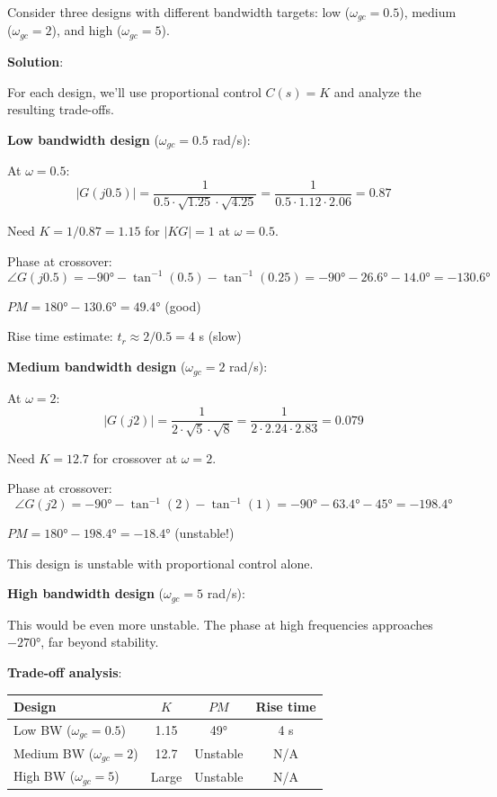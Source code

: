 Consider three designs with different bandwidth targets: low ($\omega_{gc} = 0.5$), medium ($\omega_{gc} = 2$), and high ($\omega_{gc} = 5$).

\textbf{Solution}:

For each design, we'll use proportional control $C(s) = K$ and analyze the resulting trade-offs.

\textbf{Low bandwidth design} ($\omega_{gc} = 0.5$ rad/s):

At $\omega = 0.5$:
\begin{equation}
    |G(j0.5)| = \frac{1}{0.5 \cdot \sqrt{1.25} \cdot \sqrt{4.25}} = \frac{1}{0.5 \cdot 1.12 \cdot 2.06} = 0.87
\end{equation}

Need $K = 1/0.87 = 1.15$ for $|KG| = 1$ at $\omega = 0.5$.

Phase at crossover:
\begin{equation}
    \angle G(j0.5) = -90° - \tan^{-1}(0.5) - \tan^{-1}(0.25) = -90° - 26.6° - 14.0° = -130.6°
\end{equation}

$PM = 180° - 130.6° = 49.4°$ (good)

Rise time estimate: $t_r \approx 2/0.5 = 4$ s (slow)

\textbf{Medium bandwidth design} ($\omega_{gc} = 2$ rad/s):

At $\omega = 2$:
\begin{equation}
    |G(j2)| = \frac{1}{2 \cdot \sqrt{5} \cdot \sqrt{8}} = \frac{1}{2 \cdot 2.24 \cdot 2.83} = 0.079
\end{equation}

Need $K = 12.7$ for crossover at $\omega = 2$.

Phase at crossover:
\begin{equation}
    \angle G(j2) = -90° - \tan^{-1}(2) - \tan^{-1}(1) = -90° - 63.4° - 45° = -198.4°
\end{equation}

$PM = 180° - 198.4° = -18.4°$ (unstable!)

This design is unstable with proportional control alone.

\textbf{High bandwidth design} ($\omega_{gc} = 5$ rad/s):

This would be even more unstable. The phase at high frequencies approaches $-270°$, far beyond stability.

\textbf{Trade-off analysis}:

\begin{center}
\begin{tabular}{lccc}
\toprule
\textbf{Design} & \textbf{$K$} & \textbf{$PM$} & \textbf{Rise time} \\
\midrule
Low BW ($\omega_{gc}=0.5$) & 1.15 & 49° & 4 s \\
Medium BW ($\omega_{gc}=2$) & 12.7 & Unstable & N/A \\
High BW ($\omega_{gc}=5$) & Large & Unstable & N/A \\
\bottomrule
\end{tabular}
\end{center}

